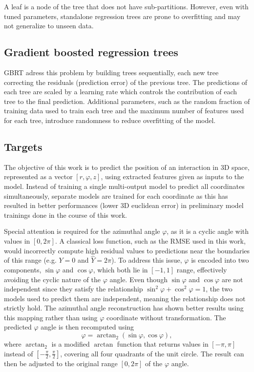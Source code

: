 A leaf is a node of the tree that does not have sub-partitions. However, even with tuned parameters, standalone regression trees are prone to overfitting and may not generalize to unseen data.

\subsection{Gradient boosted regression trees}

GBRT adress this problem by building trees sequentially, each new tree correcting the residuals (prediction error) of the previous tree. The predictions of each tree are scaled by a learning rate which controls the contribution of each tree to the final prediction. Additional parameters, such as the random fraction of training data used to train each tree and the maximum number of features used for each tree, introduce randomness to reduce overfitting of the model.

\subsection{Targets}

The objective of this work is to predict the position of an interaction in 3D space, represented as a vector $[r, \varphi, z]$, using extracted features given as inputs to the model. Instead of training a single multi-output model to predict all coordinates simultaneously, separate models are trained for each coordinate as this has resulted in better performances (lower 3D euclidean error) in preliminary model trainings done in the course of this work.

Special attention is required for the azimuthal angle $\varphi$, as it is a cyclic angle with values in $[0, 2\pi]$. A classical loss function, such as the RMSE used in this work, would incorrectly compute high residual values to predictions near the boundaries of this range (e.g. $Y = 0$ and $\hat Y = 2\pi$).
To address this issue, $\varphi$ is encoded into two components, $\sin \varphi$ and $\cos \varphi$, which both lie in $[-1, 1]$ range, effectively avoiding the cyclic nature of the $\varphi$ angle. Even though $\sin \varphi$ and $\cos \varphi$ are not independent since they satisfy the relationship $\sin^2 \varphi + \cos^2 \varphi = 1$, the two models used to predict them are independent, meaning the relationship does not strictly hold. The azimuthal angle reconstruction has shown better results using this mapping rather than using $\varphi$ coordinate without transformation. The predicted $\varphi$ angle is then recomputed using 
\begin{equation}
\label{eq:atan2}
    \varphi = \operatorname{arctan}_2(\sin \varphi, \cos \varphi),
\end{equation}
where $\operatorname{arctan}_2$ is a modified $\arctan$ function that returns values in $[-\pi, \pi]$ instead of $[-\frac{\pi}{2}, \frac{\pi}{2}]$, covering all four quadrants of the unit circle. The result can then be adjusted to the original range $[0, 2\pi]$ of the $\varphi$ angle.

